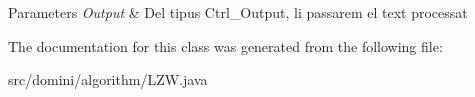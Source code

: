 \begin{DoxyParams}{Parameters}
{\em Output} & Del tipus Ctrl\+\_\+\+Output, li passarem el text processat \\
\hline
\end{DoxyParams}


The documentation for this class was generated from the following file\+:\begin{DoxyCompactItemize}
\item 
src/domini/algorithm/L\+Z\+W.\+java\end{DoxyCompactItemize}
